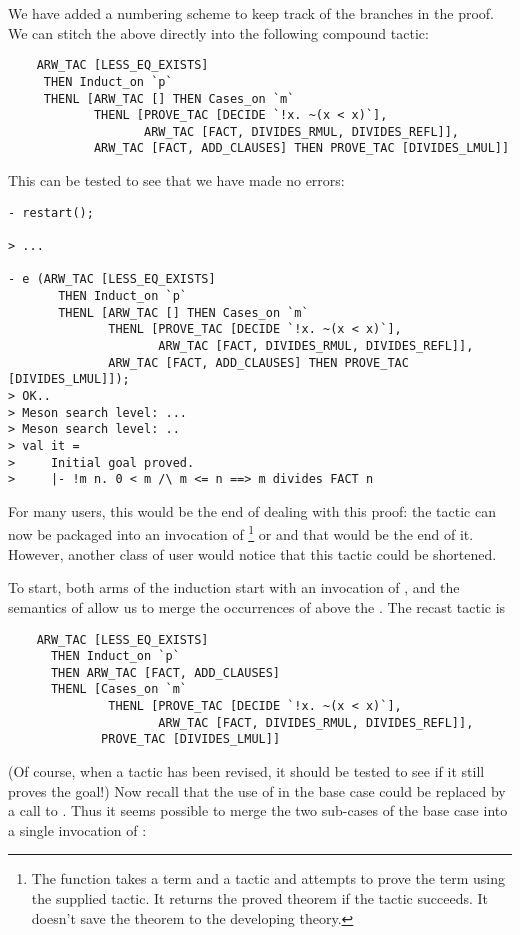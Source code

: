 We have added a numbering scheme to keep track of the branches in the
proof. We can stitch the above directly into the following compound
tactic:

{\small\begin{verbatim}
    ARW_TAC [LESS_EQ_EXISTS]
     THEN Induct_on `p`
     THENL [ARW_TAC [] THEN Cases_on `m`
            THENL [PROVE_TAC [DECIDE `!x. ~(x < x)`],
                   ARW_TAC [FACT, DIVIDES_RMUL, DIVIDES_REFL]],
            ARW_TAC [FACT, ADD_CLAUSES] THEN PROVE_TAC [DIVIDES_LMUL]]
\end{verbatim}}

\noindent This can be tested to see that we have made no errors:

\begin{session}\begin{verbatim}
- restart();

> ...

- e (ARW_TAC [LESS_EQ_EXISTS]
       THEN Induct_on `p`
       THENL [ARW_TAC [] THEN Cases_on `m`
              THENL [PROVE_TAC [DECIDE `!x. ~(x < x)`],
                     ARW_TAC [FACT, DIVIDES_RMUL, DIVIDES_REFL]],
              ARW_TAC [FACT, ADD_CLAUSES] THEN PROVE_TAC [DIVIDES_LMUL]]);
> OK..
> Meson search level: ...
> Meson search level: ..
> val it =
>     Initial goal proved.
>     |- !m n. 0 < m /\ m <= n ==> m divides FACT n
\end{verbatim}\end{session}
    For many users, this would be the end of dealing with this proof:
    the tactic can now be packaged into an invocation of
    \footnote{The  function takes a term and a
      tactic and attempts to prove the term using the supplied tactic.
      It returns the proved theorem if the tactic succeeds.  It
      doesn't save the theorem to the developing theory.} or
     and that would be the end of it. However, another
    class of user would notice that this tactic could be shortened.

To start, both arms of the induction start with an invocation of
, and the semantics of  allow us to merge the
occurrences of  above the . The recast tactic
is
{\small\begin{verbatim}
    ARW_TAC [LESS_EQ_EXISTS]
      THEN Induct_on `p`
      THEN ARW_TAC [FACT, ADD_CLAUSES]
      THENL [Cases_on `m`
              THENL [PROVE_TAC [DECIDE `!x. ~(x < x)`],
                     ARW_TAC [FACT, DIVIDES_RMUL, DIVIDES_REFL]],
             PROVE_TAC [DIVIDES_LMUL]]
\end{verbatim}}
(Of course, when a tactic has been revised, it should be tested to see
if it still proves the goal!) Now recall that the use of 
in the base case could be replaced by a call to . Thus
it seems possible to merge the two sub-cases of the base case into a
single invocation of :

